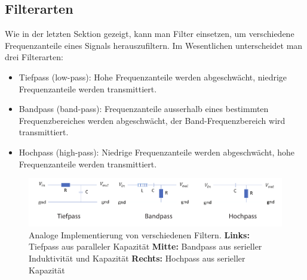     


\subsection{Filterarten}
\label{subsec:vl10-2}

Wie in der letzten Sektion gezeigt, kann man Filter einsetzen, um verschiedene Frequenzanteile eines Signals herauszufiltern. Im Wesentlichen unterscheidet man drei Filterarten:
\begin{itemize}
\setlength\itemsep{0em}
    \item Tiefpass (low-pass): Hohe Frequenzanteile werden abgeschw\"acht, niedrige Frequenzanteile werden transmittiert.
    \item Bandpass (band-pass): Frequenzanteile ausserhalb eines bestimmten Frequenzbereiches werden abgeschw\"acht, der Band-Frequenzbereich wird transmittiert.
    \item Hochpass (high-pass): Niedrige Frequenzanteile werden abgeschw\"acht, hohe Frequenzanteile werden transmittiert.
\end{itemize}

\begin{figure}[tbp]
    \centering
        \includegraphics[width=\textwidth]{Figures/filter.pdf}
        \caption{Analoge Implementierung von verschiedenen Filtern. \textbf{Links:} Tiefpass aus paralleler Kapazität \textbf{Mitte:} Bandpass aus serieller Induktivität und Kapazität \textbf{Rechts:} Hochpass aus serieller Kapazität}
        \label{fig:analogueFilters}
\end{figure}

